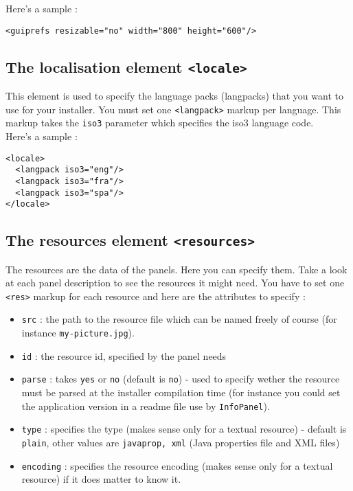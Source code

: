 Here's a sample :
\footnotesize
\begin{verbatim}
<guiprefs resizable="no" width="800" height="600"/>
\end{verbatim}
\normalsize

\subsection{The localisation element \texttt{<locale>}}

This element is used to specify the language packs (langpacks) that you want to
use for your installer. You must set one \texttt{<langpack>} markup per
language. This markup takes the \texttt{iso3} parameter which specifies the iso3
language code.\\

Here's a sample :\\
\footnotesize
\begin{verbatim}
<locale>
  <langpack iso3="eng"/>
  <langpack iso3="fra"/>
  <langpack iso3="spa"/>
</locale>
\end{verbatim}
\normalsize

\subsection{The resources element \texttt{<resources>}}

The resources are the data of the panels. Here you can specify them. Take a look
at each panel description to see the resources it might need. You have to set
one \texttt{<res>} markup for each resource and here are the attributes to
specify :
\begin{itemize}

  \item \texttt{src} : the path to the resource file which can be named freely
  of course (for instance \texttt{my-picture.jpg}).
  \item \texttt{id} : the resource id, specified by the panel needs
  \item \texttt{parse} : takes \texttt{yes} or \texttt{no} (default is
  \texttt{no}) - used to specify wether the resource must be parsed at the
  installer compilation time (for instance you could set the application version
  in a readme file use by \texttt{InfoPanel}).
  \item \texttt{type} : specifies the type (makes sense only for a textual
  resource)  - default is \texttt{plain}, other values are \texttt{javaprop,
  xml} (Java properties file and XML files)
  \item \texttt{encoding} : specifies the resource encoding (makes sense only
  for a textual resource) if it does matter to know it.

\end{itemize}\

